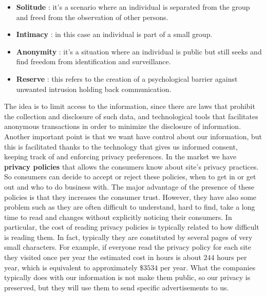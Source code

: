\begin{itemize}
\item \textbf{Solitude} : it's a scenario where an individual is separated from the group and freed from the observation of other persons.
\item \textbf{Intimacy} : in this case an individual is part of a small group.
\item \textbf{Anonymity} : it's a situation where an individual is public but still seeks and find freedom from identification and surveillance.
\item \textbf{Reserve} : this refers to the creation of a psychological barrier against unwanted intrusion holding back communication.
\end{itemize}
The idea is to limit access to the information, since there are laws that prohibit the collection and disclosure of such data, and technological tools that facilitates anonymous transactions in order to minimize the disclosure of information. Another important point is that we want have control about our information, but this is facilitated thanks to the technology that gives us informed consent, keeping track of and enforcing privacy preferences. In the market we have \textbf{privacy policies} that allows the consumers know about site's privacy practices. So consumers can decide to accept or reject these policies, when to get in or get out and who to do business with. The major advantage of the presence of these policies is that they increases the consumer trust. However, they have also some problem such as they are often difficult to understand, hard to find, take a long time to read and changes without explicitly noticing their consumers. In particular, the cost of reading privacy policies is typically related to how difficult is reading them. In fact, typically they are constituted by several pages of very small characters. For example, if everyone read the privacy policy for each site they visited once per year the estimated cost in hours is about $244$ hours per year, which is equivalent to approximately $\$3534$ per year. What the companies typically does with our information is not make them public, so our privacy is preserved, but they will use them to send specific advertisements to us.